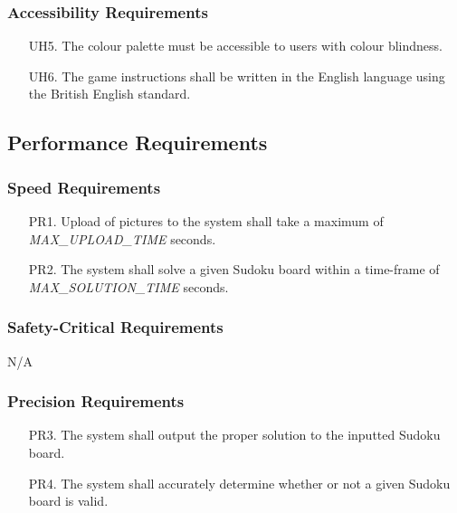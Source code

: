 \documentclass[11pt]{article}
\begin{document}
\subsubsection{Accessibility Requirements}

\begin{enumerate}
    \item [UH5.] The colour palette must be accessible to users with colour blindness.
    
    \item [UH6.] The game instructions shall be written in the English language using the British English standard.
\end{enumerate}

\subsection{Performance Requirements}

\subsubsection{Speed Requirements}

\begin{enumerate}
    \item [PR1.] Upload of pictures to the system shall take a maximum of \emph{MAX\_UPLOAD\_TIME} seconds. %
    \item [PR2.] The system shall solve a given Sudoku board within a time-frame of \emph{MAX\_SOLUTION\_TIME} seconds. %
\end{enumerate}

\subsubsection{Safety-Critical Requirements}

N/A

\subsubsection{Precision Requirements}

\begin{enumerate}
    \item [PR3.] The system shall output the proper solution to the inputted Sudoku board.
    \item [PR4.] The system shall accurately determine whether or not a given Sudoku board is valid.
\end{enumerate}
\end{document}
